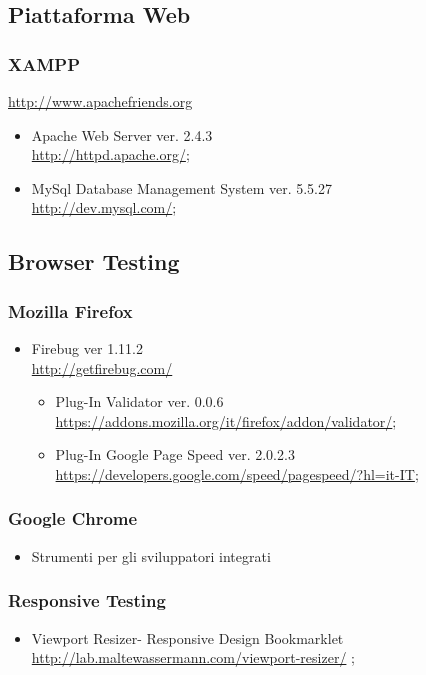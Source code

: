     \subsection{Piattaforma Web}
      \subsubsection{XAMPP}
      \href{http://www.apachefriends.org}{http://www.apachefriends.org}
      \begin{itemize}
       \item Apache Web Server ver. 2.4.3 \\
	  \href{http://httpd.apache.org/}{http://httpd.apache.org/};
       \item MySql Database Management System ver. 5.5.27 \\
	  \href{http://dev.mysql.com/}{http://dev.mysql.com/};
      \end{itemize}
    \subsection{Browser Testing}
      \subsubsection{Mozilla Firefox}
	\begin{itemize}
	 \item Firebug ver 1.11.2 \\
	  \href{http://getfirebug.com/}{http://getfirebug.com/}
	    \begin{itemize}
	     \item Plug-In Validator ver. 0.0.6 \\
	      \href{https://addons.mozilla.org/it/firefox/addon/validator/}{https://addons.mozilla.org/it/firefox/addon/validator/};
	     \item Plug-In Google Page Speed ver. 2.0.2.3 \\
	      \href{https://developers.google.com/speed/pagespeed/?hl=it-IT}{https://developers.google.com/speed/pagespeed/?hl=it-IT};
	    \end{itemize}
	\end{itemize}
      \subsubsection{Google Chrome}
	\begin{itemize}
	 \item Strumenti per gli sviluppatori integrati 
	\end{itemize}
      \subsubsection{Responsive Testing}
	\begin{itemize}
	 \item Viewport Resizer- Responsive Design Bookmarklet \\
	 \href{http://lab.maltewassermann.com/viewport-resizer/}{http://lab.maltewassermann.com/viewport-resizer/} ;
	\end{itemize}



